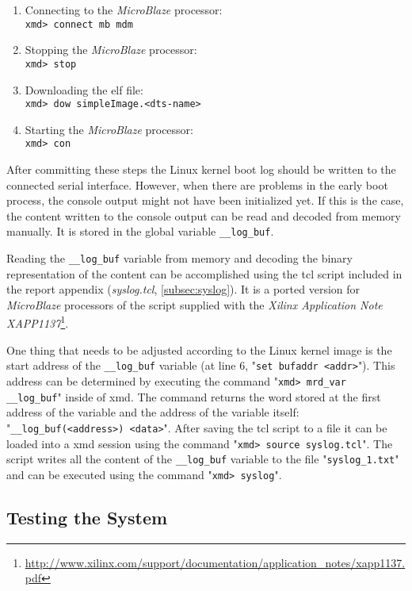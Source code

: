 \begin{enumerate}
  \setlength{\itemsep}{1pt}
  \setlength{\parskip}{2pt}
  \setlength{\parsep}{0pt}
\item Connecting to the \textit{MicroBlaze} processor:\\ \texttt{xmd> connect mb mdm}
\item Stopping the \textit{MicroBlaze} processor:\\ \texttt{xmd> stop}
\item Downloading the \gls{elf} file:\\ \texttt{xmd> dow simpleImage.<dts-name>}
\item Starting the \textit{MicroBlaze} processor:\\ \texttt{xmd> con}
\end{enumerate}

After committing these steps the Linux kernel boot log should be written to the connected serial interface. However, when there are problems in the early boot process, the console output might not have been initialized yet. If this is the case, the content written to the console output can be read and decoded from memory manually. It is stored in the global variable \texttt{\_\_log\_buf}. 

Reading the \texttt{\_\_log\_buf} variable from memory and decoding the binary representation of the content can be accomplished using the \gls{tcl} script included in the report appendix (\textit{syslog.tcl}, \ref{subsec:syslog}). It is a ported version for \textit{MicroBlaze} processors of the script supplied with the \textit{Xilinx Application Note XAPP1137}\footnote{\url{http://www.xilinx.com/support/documentation/application\_notes/xapp1137.pdf}}. 

One thing that needs to be adjusted according to the Linux kernel image is the start address of the \texttt{\_\_log\_buf} variable (at line 6, "\texttt{set bufaddr <addr>}"). This address can be determined by executing the command "\texttt{xmd> mrd\_var \_\_log\_buf}" inside of \gls{xmd}. The command returns the word stored at the first address of the variable and the address of the variable itself: "\texttt{\_\_log\_buf(<address>)   <data>}". After saving the \gls{tcl} script to a file it can be loaded into a \gls{xmd} session using the command "\texttt{xmd> source syslog.tcl}". The script writes all the content of the \texttt{\_\_log\_buf} variable to the file "\texttt{syslog\_1.txt}" and can be executed using the command "\texttt{xmd> syslog}".

\subsection{Testing the System}

